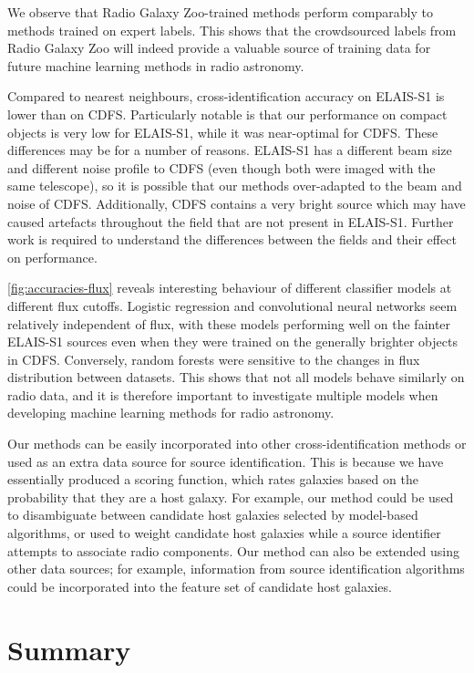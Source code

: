 \documentclass[fleqn,usenatbib,usedcolumn]{mnras}
\begin{document}
  We observe that Radio Galaxy Zoo-trained methods perform comparably to
  methods trained on expert labels. This shows that the crowdsourced labels
  from Radio Galaxy Zoo will indeed provide a valuable source of training
  data for future machine learning methods in radio astronomy.

  Compared to nearest neighbours, cross-identification accuracy on ELAIS-S1 is lower than on CDFS. Particularly notable is that our performance on compact objects is very low for ELAIS-S1, while it was near-optimal for CDFS. These differences may be for a number of reasons. ELAIS-S1 has a different beam size and different noise profile to CDFS (even though both were imaged with the same telescope), so it is possible that our methods over-adapted to the beam and noise of CDFS. Additionally, CDFS contains a very bright source which may have caused artefacts throughout the field that are not present in ELAIS-S1. Further work is required to understand the differences between the fields and their effect on performance.

  \autoref{fig:accuracies-flux} reveals interesting behaviour of different
  classifier models at different flux cutoffs. Logistic regression and
  convolutional neural networks seem relatively independent of flux, with
  these models performing well on the fainter ELAIS-S1 sources even when
  they were trained on the generally brighter objects in CDFS. Conversely,
  random forests were sensitive to the changes in flux distribution between
  datasets. This shows that not all models behave similarly on radio data,
  and it is therefore important to investigate multiple models when
  developing machine learning methods for radio astronomy.



  Our methods can be easily incorporated into other cross-identification
  methods or used as an extra data source for source identification. This is
  because we have essentially produced a scoring function, which rates
  galaxies based on the probability that they are a host galaxy. For
  example, our method could be used to disambiguate between candidate host
  galaxies selected by model-based algorithms, or used to weight candidate
  host galaxies while a source identifier attempts to associate radio
  components. Our method can also be extended using other data sources; for
  example, information from source identification algorithms could be
  incorporated into the feature set of candidate host galaxies.

\section{Summary}
\end{document}
